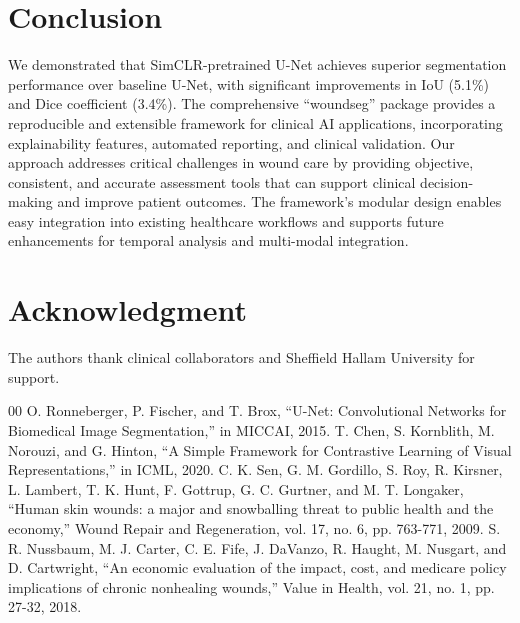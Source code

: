 \documentclass[conference]{IEEEtran}
\begin{document}
\section{Conclusion}
We demonstrated that SimCLR-pretrained U-Net achieves superior segmentation performance over baseline U-Net, with significant improvements in IoU (5.1\%) and Dice coefficient (3.4\%). The comprehensive ``woundseg'' package provides a reproducible and extensible framework for clinical AI applications, incorporating explainability features, automated reporting, and clinical validation. Our approach addresses critical challenges in wound care by providing objective, consistent, and accurate assessment tools that can support clinical decision-making and improve patient outcomes. The framework's modular design enables easy integration into existing healthcare workflows and supports future enhancements for temporal analysis and multi-modal integration.

\section*{Acknowledgment}
The authors thank clinical collaborators and Sheffield Hallam University for support.

\begin{thebibliography}{00}
 O. Ronneberger, P. Fischer, and T. Brox, ``U-Net: Convolutional Networks for Biomedical Image Segmentation,'' in MICCAI, 2015.
 T. Chen, S. Kornblith, M. Norouzi, and G. Hinton, ``A Simple Framework for Contrastive Learning of Visual Representations,'' in ICML, 2020.
 C. K. Sen, G. M. Gordillo, S. Roy, R. Kirsner, L. Lambert, T. K. Hunt, F. Gottrup, G. C. Gurtner, and M. T. Longaker, ``Human skin wounds: a major and snowballing threat to public health and the economy,'' Wound Repair and Regeneration, vol. 17, no. 6, pp. 763-771, 2009.
 S. R. Nussbaum, M. J. Carter, C. E. Fife, J. DaVanzo, R. Haught, M. Nusgart, and D. Cartwright, ``An economic evaluation of the impact, cost, and medicare policy implications of chronic nonhealing wounds,'' Value in Health, vol. 21, no. 1, pp. 27-32, 2018.
\end{thebibliography}
\end{document}
